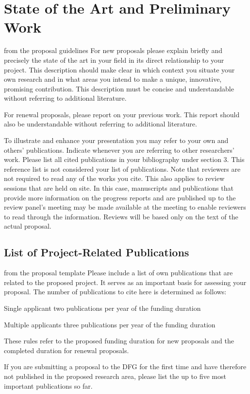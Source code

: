 \section{State of the Art and Preliminary Work}\label{sec:state}
\begin{todo}{from the proposal guidelines}
  For new proposals please explain briefly and precisely the state of the art in your
  field in its direct relationship to your project. This description should make clear in
  which context you situate your own research and in what areas you intend to make a
  unique, innovative, promising contribution. This description must be concise and
  understandable without referring to additional literature.

  For renewal proposals, please report on your previous work. This report should also be
  understandable without referring to additional literature.

  To illustrate and enhance your presentation you may refer to your own and others’
  publications. Indicate whenever you are referring to other researchers’ work.  Please
  list all cited publications in your bibliography under section 3. This reference list is
  not considered your list of publications. Note that reviewers are not required to read
  any of the works you cite. This also applies to review sessions that are held on
  site. In this case, manuscripts and publications that provide more information on the
  progress reports and are published up to the review panel’s meeting may be made
  available at the meeting to enable reviewers to read through the information. Reviews
  will be based only on the text of the actual proposal.
\end{todo}

\subsection{List of Project-Related Publications}\label{sec:projpapers}

\begin{todo}{from the proposal template}
  Please include a list of own publications that are related to the proposed project. It
  serves as an important basis for assessing your proposal. The number of publications to
  cite here is determined as follows:
  \begin{compactdesc}
    \item[Single applicant] two publications per year of the funding duration
    \item[Multiple applicants] three publications per year of the funding duration
    \end{compactdesc}
    These rules refer to the proposed funding duration for new proposals and the completed
    duration for renewal proposals.
    
    If you are submitting a proposal to the DFG for the first time and have therefore not
    published in the proposed research area, please list the up to five most important
    publications so far.
\end{todo}

